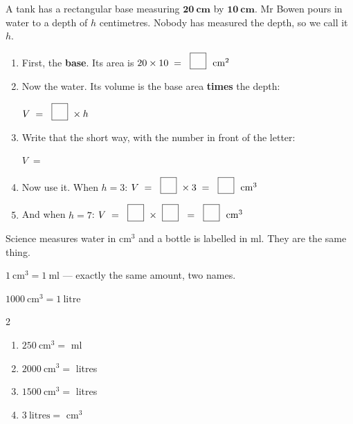 \documentclass[12pt,a4paper]{article}
\newcommand{\nbox}{\ \fbox{\rule{0pt}{1.05em}\rule{1.0em}{0pt}}\ }
\begin{document}

\noindent A tank has a rectangular base measuring $\mathbf{20\ cm}$ by
$\mathbf{10\ cm}$. Mr Bowen pours in water to a depth of $h$ centimetres. Nobody
has measured the depth, so we call it $h$.

\vspace{5pt}
\begin{enumerate}[label=(\alph*), itemsep=13pt]
  \item First, the \textbf{base}. Its area is \;
        $20 \times 10 \;=\; \nbox\ \mathrm{cm^2}$
  \item Now the water. Its volume is the base area \textbf{times} the depth:

        \smallskip
        $V \;=\; \nbox \times h$
  \item Write that the short way, with the number in front of the letter:

        \smallskip
        $V \;=\;$ \blank[3.0cm]
  \item Now use it. When $h = 3$: \hfill
        $V \;=\; \nbox \times 3 \;=\; \nbox\ \mathrm{cm^3}$
  \item And when $h = 7$: \hfill
        $V \;=\; \nbox \times \nbox \;=\; \nbox\ \mathrm{cm^3}$
\end{enumerate}


\noindent Science measures water in $\mathrm{cm^3}$ and a bottle is labelled in ml.
They are the same thing.

\begin{remember}
  $1\ \mathrm{cm^3} = 1\ \mathrm{ml}$ \quad --- exactly the same amount, two names.

  \smallskip
  $1000\ \mathrm{cm^3} = 1\ \mathrm{litre}$
\end{remember}

\vspace{2pt}
\begin{multicols}{2}
\begin{enumerate}[label=(\alph*), itemsep=12pt]
  \item $250\ \mathrm{cm^3} =$ \blank[2.0cm] ml
  \item $2000\ \mathrm{cm^3} =$ \blank[2.0cm] litres
  \item $1500\ \mathrm{cm^3} =$ \blank[2.0cm] litres
  \item $3\ \mathrm{litres} =$ \blank[2.0cm] $\mathrm{cm^3}$
\end{enumerate}
\end{multicols}
\end{document}
